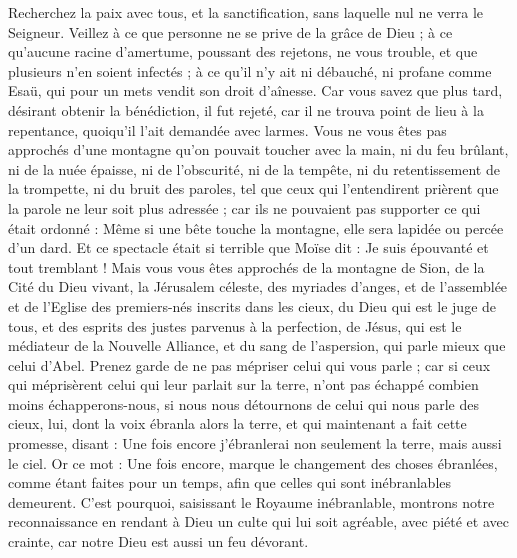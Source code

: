 \begin{multicols}{2}
Recherchez la paix avec tous, et la sanctification, sans laquelle nul ne verra le Seigneur.
Veillez à ce que personne ne se prive de la grâce de Dieu ; à ce qu’aucune racine d'amertume, poussant des rejetons, ne vous trouble, et que plusieurs n’en soient infectés ;
à ce qu’il n’y ait ni débauché, ni profane comme Esaü, qui pour un mets vendit son droit d’aînesse.
Car vous savez que plus tard, désirant obtenir la bénédiction, il fut rejeté, car il ne trouva point de lieu à la repentance, quoiqu'il l’ait demandée avec larmes.
Vous ne vous êtes pas approchés d’une montagne qu’on pouvait toucher avec la main, ni du feu brûlant, ni de la nuée épaisse, ni de l'obscurité, ni de la tempête,
ni du retentissement de la trompette, ni du bruit des paroles, tel que ceux qui l'entendirent prièrent que la parole ne leur soit plus adressée ;
car ils ne pouvaient pas supporter ce qui était ordonné : Même si une bête touche la montagne, elle sera lapidée ou percée d'un dard.
Et ce spectacle était si terrible que Moïse dit : Je suis épouvanté et tout tremblant !
Mais vous vous êtes approchés de la montagne de Sion, de la Cité du Dieu vivant, la Jérusalem céleste, des myriades d'anges,
et de l'assemblée et de l'Eglise des premiers-nés inscrits dans les cieux, du Dieu qui est le juge de tous, et des esprits des justes parvenus à la perfection,
de Jésus, qui est le médiateur de la Nouvelle Alliance, et du sang de l'aspersion, qui parle mieux que celui d'Abel.
Prenez garde de ne pas mépriser celui qui vous parle ; car si ceux qui méprisèrent celui qui leur parlait sur la terre, n’ont pas échappé combien moins échapperons-nous, si nous nous détournons de celui qui nous parle des cieux,
lui, dont la voix ébranla alors la terre, et qui maintenant a fait cette promesse, disant : Une fois encore j'ébranlerai non seulement la terre, mais aussi le ciel.
Or ce mot : Une fois encore, marque le changement des choses ébranlées, comme étant faites pour un temps, afin que celles qui sont inébranlables demeurent.
C'est pourquoi, saisissant le Royaume inébranlable, montrons notre reconnaissance en rendant à Dieu un culte qui lui soit agréable, avec piété et avec crainte,
car notre Dieu est aussi un feu dévorant.

\end{multicols}
